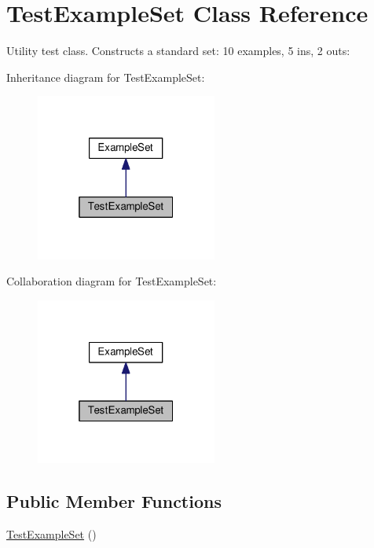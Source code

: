 \hypertarget{classTestExampleSet}{}\section{Test\+Example\+Set Class Reference}
\label{classTestExampleSet}


Utility test class. Constructs a standard set\+: 10 examples, 5 ins, 2 outs\+:  




Inheritance diagram for Test\+Example\+Set\+:
\nopagebreak
\begin{figure}[H]
\begin{center}
\leavevmode
\includegraphics[width=169pt]{classTestExampleSet__inherit__graph}
\end{center}
\end{figure}


Collaboration diagram for Test\+Example\+Set\+:
\nopagebreak
\begin{figure}[H]
\begin{center}
\leavevmode
\includegraphics[width=169pt]{classTestExampleSet__coll__graph}
\end{center}
\end{figure}
\subsection*{Public Member Functions}
\begin{DoxyCompactItemize}
\item 
\hyperlink{classTestExampleSet_ac1bd59a78634c451fc6b772d5fcf484f}{Test\+Example\+Set} ()
\end{DoxyCompactItemize}
